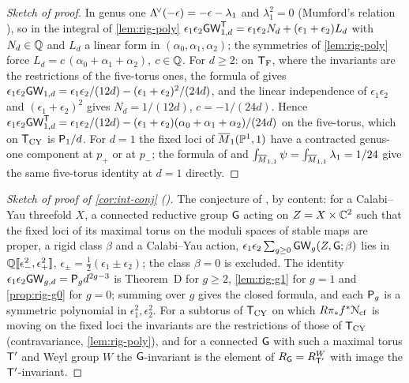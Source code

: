 \begin{proof}[Sketch of proof]
In genus one $\Lambda^{\!\vee}(-\epsilon)=-\epsilon-\lambda_1$ and $\lambda_1^2=0$ (Mumford's relation \cite{Mum83}), so in the integral of \cref{lem:rig-poly} $\epsilon_1\epsilon_2\mathsf{GW}^{\mathsf{T}}_{1,d}=\epsilon_1\epsilon_2N_d+(\epsilon_1+\epsilon_2)L_d$ with $N_d\in\mathbb{Q}$ and $L_d$ a linear form in $(\alpha_0,\alpha_1,\alpha_2)$; the symmetries of \cref{lem:rig-poly} force $L_d=c\,(\alpha_0+\alpha_1+\alpha_2)$, $c\in\mathbb{Q}$. For $d\geq2$: on $\mathsf{T}_{\mathrm{F}}$, where the invariants are the restrictions of the five-torus ones, the formula of \cite{BS} gives $\epsilon_1\epsilon_2\mathsf{GW}_{1,d}=\epsilon_1\epsilon_2/(12d)-(\epsilon_1+\epsilon_2)^2/(24d)$, and the linear independence of $\epsilon_1\epsilon_2$ and $(\epsilon_1+\epsilon_2)^2$ gives $N_d=1/(12d)$, $c=-1/(24d)$. Hence $\epsilon_1\epsilon_2\mathsf{GW}^{\mathsf{T}}_{1,d}=\epsilon_1\epsilon_2/(12d)-(\epsilon_1+\epsilon_2)(\alpha_0+\alpha_1+\alpha_2)/(24d)$ on the five-torus, which on $\mathsf{T}_{\mathrm{CY}}$ is $\mathsf{P}_{1}/d$. For $d=1$ the fixed loci of $\overline{M}_1(\mathbb{P}^1,1)$ have a contracted genus-one component at $p_+$ or at $p_-$; the formula of \cite{GP99} and $\int_{\overline{M}_{1,1}}\psi=\int_{\overline{M}_{1,1}}\lambda_1=1/24$ give the same five-torus identity at $d=1$ directly.
\end{proof}

\begin{proof}[Sketch of proof of \cref{cor:int-conj} \textup{()}]
The conjecture of \cite{BS}, by content: for a Calabi--Yau threefold $X$, a connected reductive group $\mathsf{G}$ acting on $Z=X\times\mathbb{C}^2$ such that the fixed loci of its maximal torus on the moduli spaces of stable maps are proper, a rigid class $\beta$ and a Calabi--Yau action, $\epsilon_1\epsilon_2\sum_{g\geq0}\mathsf{GW}_g(Z,\mathsf{G};\beta)$ lies in $\mathbb{Q}[\![ \epsilon_-^2,\epsilon_+^2 ]\!]$, $\epsilon_\pm=\frac12(\epsilon_1\pm\epsilon_2)$; the class $\beta=0$ is excluded. The identity $\epsilon_1\epsilon_2\mathsf{GW}_{g,d}=\mathsf{P}_{g} d^{2g-3}$ is Theorem~D for $g\geq2$, \cref{lem:rig-g1} for $g=1$ and \cref{prop:rig-g0} for $g=0$; summing over $g$ gives the closed formula, and each $\mathsf{P}_{g}$ is a symmetric polynomial in $\epsilon_1^2,\epsilon_2^2$. For a subtorus of $\mathsf{T}_{\mathrm{CY}}$ on which $R\pi_*f^*\mathcal{N}_{\mathrm{cf}}$ is moving on the fixed loci the invariants are the restrictions of those of $\mathsf{T}_{\mathrm{CY}}$ (contravariance, \cref{lem:rig-poly}), and for a connected $\mathsf{G}$ with such a maximal torus $\mathsf{T}'$ and Weyl group $W$ the $\mathsf{G}$-invariant is the element of $R_{\mathsf{G}}=R_{\mathsf{T}'}^{W}$ with image the $\mathsf{T}'$-invariant.
\end{proof}


